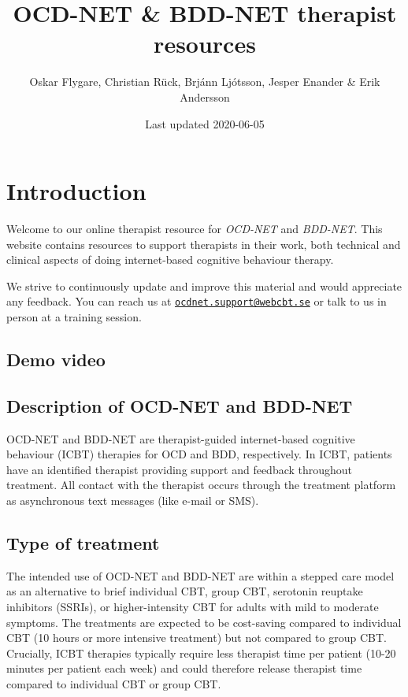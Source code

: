 \documentclass[]{book}
\title{OCD-NET \& BDD-NET therapist resources}
\author{Oskar Flygare, Christian Rück, Brjánn Ljótsson, Jesper Enander \& Erik Andersson}
\date{Last updated 2020-06-05}
\begin{document}
\maketitle

{
\setcounter{tocdepth}{1}
\tableofcontents
}
\hypertarget{introduction}{%
\chapter{Introduction}\label{introduction}}

Welcome to our online therapist resource for \emph{OCD-NET} and \emph{BDD-NET}. This website contains resources to support therapists in their work, both technical and clinical aspects of doing internet-based cognitive behaviour therapy.

We strive to continuously update and improve this material and would appreciate any feedback. You can reach us at \href{mailto:ocdnet.support@webcbt.se}{\nolinkurl{ocdnet.support@webcbt.se}} or talk to us in person at a training session.

\hypertarget{demo-video}{%
\section{Demo video}\label{demo-video}}

\hypertarget{description-of-ocd-net-and-bdd-net}{%
\section{Description of OCD-NET and BDD-NET}\label{description-of-ocd-net-and-bdd-net}}

OCD-NET and BDD-NET are therapist-guided internet-based cognitive behaviour (ICBT) therapies for OCD and BDD, respectively. In ICBT, patients have an identified therapist providing support and feedback throughout treatment. All contact with the therapist occurs through the treatment platform as asynchronous text messages (like e-mail or SMS).

\hypertarget{type-of-treatment}{%
\section{Type of treatment}\label{type-of-treatment}}

The intended use of OCD-NET and BDD-NET are within a stepped care model as an alternative to brief individual CBT, group CBT, serotonin reuptake inhibitors (SSRIs), or higher-intensity CBT for adults with mild to moderate symptoms. The treatments are expected to be cost-saving compared to individual CBT (10 hours or more intensive treatment) but not compared to group CBT. Crucially, ICBT therapies typically require less therapist time per patient (10-20 minutes per patient each week) and could therefore release therapist time compared to individual CBT or group CBT.
\end{document}
